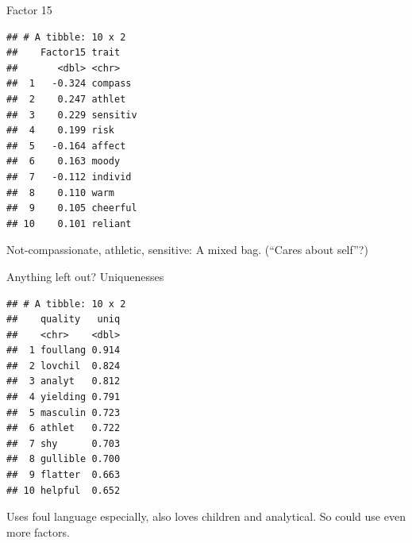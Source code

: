 \documentclass[
  ignorenonframetext,
]{beamer}
\newenvironment{Shaded}{\begin{snugshade}}{\end{snugshade}}
\newcommand{\DataTypeTok}[1]{\textcolor[rgb]{0.13,0.29,0.53}{#1}}
\newcommand{\DecValTok}[1]{\textcolor[rgb]{0.00,0.00,0.81}{#1}}
\newcommand{\FloatTok}[1]{\textcolor[rgb]{0.00,0.00,0.81}{#1}}
\newcommand{\KeywordTok}[1]{\textcolor[rgb]{0.13,0.29,0.53}{\textbf{#1}}}
\newcommand{\NormalTok}[1]{#1}
\newcommand{\OperatorTok}[1]{\textcolor[rgb]{0.81,0.36,0.00}{\textbf{#1}}}
\newcommand{\StringTok}[1]{\textcolor[rgb]{0.31,0.60,0.02}{#1}}
\begin{document}
\begin{frame}[fragile]{Factor 15}
\protect\hypertarget{factor-15}{}

\footnotesize

\begin{Shaded}
\end{Shaded}

\begin{verbatim}
## # A tibble: 10 x 2
##    Factor15 trait   
##       <dbl> <chr>   
##  1   -0.324 compass 
##  2    0.247 athlet  
##  3    0.229 sensitiv
##  4    0.199 risk    
##  5   -0.164 affect  
##  6    0.163 moody   
##  7   -0.112 individ 
##  8    0.110 warm    
##  9    0.105 cheerful
## 10    0.101 reliant
\end{verbatim}

\normalsize

Not-compassionate, athletic, sensitive: A mixed bag. (``Cares about
self''?)

\end{frame}

\begin{frame}[fragile]{Anything left out? Uniquenesses}
\protect\hypertarget{anything-left-out-uniquenesses}{}

\scriptsize

\begin{Shaded}
\end{Shaded}

\begin{verbatim}
## # A tibble: 10 x 2
##    quality   uniq
##    <chr>    <dbl>
##  1 foullang 0.914
##  2 lovchil  0.824
##  3 analyt   0.812
##  4 yielding 0.791
##  5 masculin 0.723
##  6 athlet   0.722
##  7 shy      0.703
##  8 gullible 0.700
##  9 flatter  0.663
## 10 helpful  0.652
\end{verbatim}

\normalsize

Uses foul language especially, also loves children and analytical. So
could use even more factors.

\end{frame}
\end{document}
